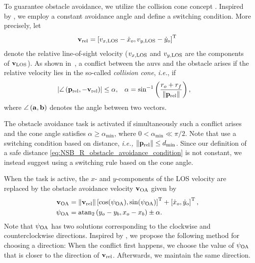To guarantee obstacle avoidance, we utilize the collision cone concept \cite{chakravarthy_obstacle_1998}. 
Inspired by \cite{wiig_collision_2019}, we employ a constant avoidance angle and define a switching condition.
More precisely, let 
\begin{equation}
    \mathbf{v}_{\rm rel} = \left[v_{x, {\rm LOS}} - \dot{x}_o, v_{y, {\rm LOS}} - \dot{y}_o\right]^{\mathrm{T}}
    \label{eq:NSB_R_v_rel}
\end{equation}
denote the relative line-of-sight velocity ($v_{x, {\rm LOS}}$ and $v_{y, {\rm LOS}}$ are the components of $\mathbf{v}_{\rm LOS}$).
As shown in~, a conflict between the \glspl{auv} and the obstacle arises if the relative velocity lies in the so-called \emph{collision cone}, \emph{i.e.}, if
\begin{align}
    \left|\angle\left(\mathbf{p}_{\rm rel}, -\mathbf{v}_{\rm rel}\right)\right| &\leq \alpha, &
    \alpha &= \sin^{-1}\left(\frac{r_o+r_f}{\left\|\mathbf{p}_{\rm rel}\right\|}\right),
    \label{eq:NSB_R_collision-conflict}
\end{align}
where $\angle\left(\mathbf{a}, \mathbf{b}\right)$ denotes the angle between two vectors.


The obstacle avoidance task is activated if simultaneously such a conflict arises and the cone angle satisfies 
$\alpha \geq \alpha_{\min}$, where $0 < \alpha_{\min} \ll \pi / 2$.
Note that \cite{wiig_collision_2019} use a switching condition based on distance, \emph{i.e.,}
$\left\|\mathbf{p}_{\rm rel}\right\| \leq d_{\min}$.
Since our definition of a safe distance \eqref{eq:NSB_R_obstacle_avoidance_condition} is not constant, we instead suggest using a switching rule based on the cone angle.



When the task is active, the $x$- and $y$-components of the LOS velocity are replaced by the obstacle avoidance velocity $\mathbf{v}_{\rm OA}$ given by 
\begin{align}
    \mathbf{v}_{\rm OA} &= \left\|\mathbf{v}_{\rm rel}\right\| \left[\cos(\psi_{\rm OA}), \sin(\psi_{\rm OA})\right]^{\mathrm{T}} + \left[\dot{x}_o, \dot{y}_o\right]^{\mathrm{T}}, \\
    \psi_{\rm OA} &= {\rm atan}_2 \left(y_o - y_b, x_o - x_b\right) \pm \alpha.
\end{align}
Note that $\psi_{\rm OA}$ has two solutions corresponding to the clockwise and counterclockwise directions.
Inspired by \cite{haraldsen_reactive_2021}, we propose the following method for choosing a direction:
When the conflict first happens, we choose the value of $\psi_{\rm OA}$ that is closer to the direction of $\mathbf{v}_{\rm rel}$.
Afterwards, we maintain the same direction.




